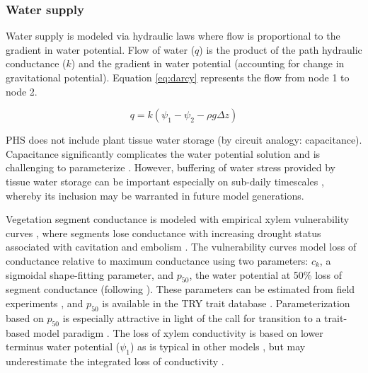 \documentclass[draft,linenumbers]{agujournal}
\begin{document}
    \subsubsection{Water supply}
    \label{sect:supply}
    Water supply is modeled via hydraulic laws where flow is proportional to the gradient in water potential. 
    Flow of water ($q$) is the product of the path hydraulic conductance ($k$) and 
    the gradient in water potential (accounting for change in gravitational potential). 
    Equation \ref{eq:darcy} represents the flow from node 1 to node 2. 
    
     \begin{linenomath*}
     \begin{equation}
     \label{eq:darcy}
     q = k\left(\psi_1 - \psi_2 - \rho g \Delta z\right)
     \end{equation}
     \end{linenomath*}
    
    PHS does not include plant tissue water storage (by circuit analogy: capacitance). 
    Capacitance significantly complicates the water potential solution \citep{celia1990}
    and is challenging to parameterize \citep{bartlett2016}.
    However, buffering of water stress provided by tissue water storage can be important
    especially on sub-daily timescales \citep{meinzer2009}, whereby its inclusion may be warranted 
    in future model generations.

     
     Vegetation segment conductance is modeled with empirical xylem vulnerability curves \citep{tyree1989}, 
     where segments lose conductance with increasing drought status associated with 
     cavitation and embolism \citep{holbrook2001}.
     The vulnerability curves model loss of conductance relative to maximum conductance using two parameters: 
     $c_k$, a sigmoidal shape-fitting parameter, and 
     $p_{50}$, the water potential at 50\% loss of segment conductance (following \cite{gentine2016}). 
     These parameters can be estimated from field experiments \citep{sack2002}, 
     and $p_{50}$ is available in the TRY trait database \citep{kattge2011}.
     Parameterization based on $p_{50}$ is especially attractive in light of the call for transition to
     a trait-based model paradigm \citep{anderegg2015a}.
     The loss of xylem conductivity is based on lower terminus water potential ($\psi_1$)
     as is typical in other models \citep{xu2016}, but 
     may underestimate the integrated loss of conductivity \citep{sperry2015}. 
         
\end{document}
